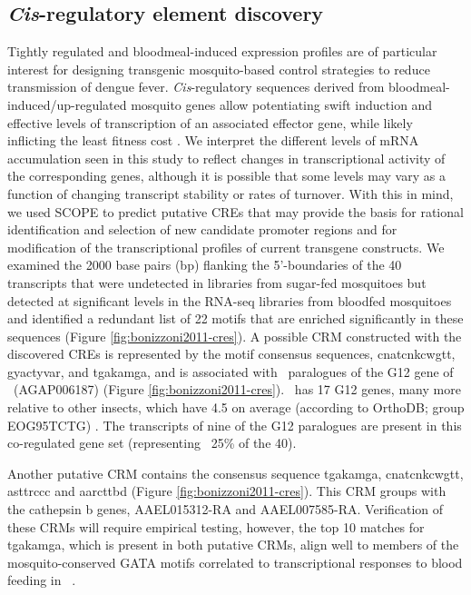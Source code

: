 \subsection{\textit{Cis}-regulatory element discovery}
Tightly regulated and bloodmeal-induced expression profiles are of particular interest for designing transgenic mosquito-based control strategies to reduce transmission of dengue fever. \textit{Cis}-regulatory sequences derived from bloodmeal-induced/up-regulated mosquito genes allow potentiating swift induction and effective levels of transcription of an associated effector gene, while likely inflicting the least fitness cost \cite{Marelli2006,Marelli2006}. We interpret the different levels of mRNA accumulation seen in this study to reflect changes in transcriptional activity of the corresponding genes, although it is possible that some levels may vary as a function of changing transcript stability or rates of turnover. With this in mind, we used SCOPE \cite{Carlson2007} to predict putative \glspl{CRE} that may provide the basis for rational identification and selection of new candidate promoter regions and for modification of the transcriptional profiles of current transgene constructs. We examined the 2000 base pairs (bp) flanking the 5'-boundaries of the 40 transcripts that were undetected in libraries from sugar-fed mosquitoes but detected at significant levels in the RNA-seq libraries from bloodfed mosquitoes and identified a redundant list of 22 motifs that are enriched significantly in these sequences (Figure \ref{fig:bonizzoni2011-cres}). A possible \gls{CRM} constructed with the discovered \glspl{CRE} is represented by the motif consensus sequences, cnatcnkcwgtt, gyactyvar, and tgakamga, and is associated with \Aa\  paralogues of the G12 gene of \Ag\ (AGAP006187) (Figure \ref{fig:bonizzoni2011-cres}). \Aa\ has 17 G12 genes, many more relative to other insects, which have 4.5 on average (according to OrthoDB; group EOG95TCTG) \cite{Kriventseva2008}. The transcripts of nine of the G12 paralogues are present in this co-regulated gene set (representing ~25\% of the 40).

Another putative \gls{CRM} contains the consensus sequence tgakamga, cnatcnkcwgtt, asttrccc and aarcttbd (Figure \ref{fig:bonizzoni2011-cres}). This \gls{CRM} groups with the cathepsin b genes, AAEL015312-RA and AAEL007585-RA. Verification of these \glspl{CRM} will require empirical testing, however, the top 10 matches for tgakamga, which is present in both putative \glspl{CRM}, align well to members of the mosquito-conserved GATA motifs correlated to transcriptional responses to blood feeding in \Ag\ \cite{Sieglaff2009}.





